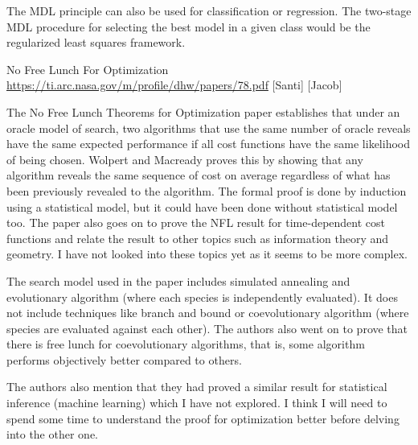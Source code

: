 \documentclass[12pt]{article}
\begin{document}
The MDL principle can also be used for classification or regression. The two-stage MDL procedure for selecting the best model in a given class would be the regularized least squares framework.

No Free Lunch For Optimization
\url{https://ti.arc.nasa.gov/m/profile/dhw/papers/78.pdf} [Santi] [Jacob]	

The No Free Lunch Theorems for Optimization paper establishes that under an oracle model of search, two algorithms that use the same number of oracle reveals have the same expected performance if all cost functions have the same likelihood of being chosen. Wolpert and Macready proves this by showing that any algorithm reveals the same sequence of cost on average regardless of what has been previously revealed to the algorithm. The formal proof is done by induction using a statistical model, but it could have been done without statistical model too. The paper also goes on to prove the NFL result for time-dependent cost functions and relate the result to other topics such as information theory and geometry. I have not looked into these topics yet as it seems to be more complex.

The search model used in the paper includes simulated annealing and evolutionary algorithm (where each species is independently evaluated). It does not include techniques like branch and bound or coevolutionary algorithm (where species are evaluated against each other). The authors also went on to prove that there is free lunch for coevolutionary algorithms, that is, some algorithm performs objectively better compared to others.

The authors also mention that they had proved a similar result for statistical inference (machine learning) which I have not explored. I think I will need to spend some time to understand the proof for optimization better before delving into the other one.
\end{document}
